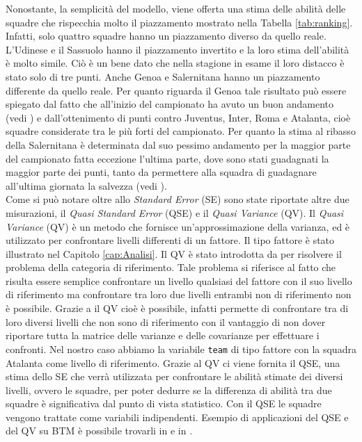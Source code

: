 Nonostante, la semplicità del modello, viene offerta una stima delle abilità delle squadre che rispecchia molto il piazzamento mostrato nella Tabella \ref{tab:ranking}. Infatti, solo quattro squadre hanno un piazzamento diverso da quello reale. L'Udinese e il Sassuolo hanno il piazzamento invertito e la loro stima dell'abilità è molto simile. Ciò è un bene dato che nella stagione in esame il loro distacco è stato solo di tre punti. Anche Genoa e Salernitana hanno un piazzamento differente da quello reale. Per quanto riguarda il Genoa tale risultato può essere spiegato dal fatto che all'inizio del campionato ha avuto un buon andamento (vedi \textit{\cite{site:storyGenoa}}) e dall'ottenimento di punti contro Juventus, Inter, Roma e Atalanta, cioè squadre considerate tra le più forti del campionato. Per quanto la stima al ribasso della Salernitana è determinata dal suo pessimo andamento per la maggior parte del campionato fatta eccezione l'ultima parte, dove sono stati guadagnati la maggior parte dei punti, tanto da permettere alla squadra di guadagnare all'ultima giornata la salvezza (vedi \textit{\cite{site:storySal}}). \\
Come si può notare oltre allo \emph{Standard Error} (SE) sono state riportate altre due misurazioni, il \emph{Quasi Standard Error} (QSE) \autocite{firth2004quasi} e il \emph{Quasi Variance} (QV)\autocite{firth2004quasi}. Il \emph{Quasi Variance} (QV)\autocite{firth2004quasi} è un metodo che fornisce un'approssimazione della varianza, ed è utilizzato per confrontare livelli differenti di un fattore. Il tipo fattore è stato illustrato nel Capitolo \ref{cap:Analisi}. Il QV è stato introdotta da \autocite{firth2004quasi} per risolvere il problema della categoria di riferimento. Tale problema si riferisce al fatto che risulta essere semplice confrontare un livello qualsiasi del fattore con il suo livello di riferimento ma confrontare tra loro due livelli entrambi non di riferimento non è possibile. Grazie a il QV cioè è possibile, infatti permette di confrontare tra di loro diversi livelli che non sono di riferimento con il vantaggio di non dover riportare tutta la matrice delle varianze e delle covarianze per effettuare i confronti. Nel nostro caso abbiamo la variabile \texttt{team} di tipo fattore con la squadra Atalanta come livello di riferimento. Grazie al QV ci viene fornita il QSE, una stima dello SE che verrà utilizzata per confrontare le abilità stimate dei diversi livelli, ovvero le squadre, per poter dedurre se la differenza di abilità tra due squadre è significativa dal punto di vista statistico. Con il QSE le squadre vengono trattate come variabili indipendenti. Esempio di applicazioni del QSE e del QV su BTM è possibile trovarli in \textcite{firth2004quasi} e in \textcite{turner2012bradley}.\\
